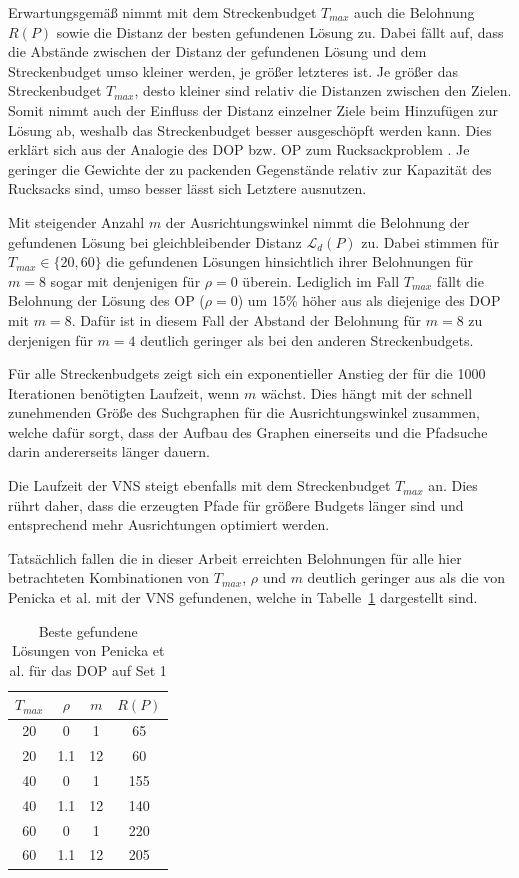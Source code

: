 \documentclass[12pt,a4paper,twoside]{article}
\theoremstyle{definition}
\numberwithin{equation}{section}
\begin{document}
Erwartungsgemäß nimmt mit dem Streckenbudget $T_{max}$ auch die Belohnung $R(P)$ sowie die Distanz der besten gefundenen Lösung zu. Dabei fällt auf, dass die Abstände zwischen der Distanz der gefundenen Lösung und dem Streckenbudget umso kleiner werden, je größer letzteres ist. Je größer das Streckenbudget $T_{max}$, desto kleiner sind relativ die Distanzen zwischen den Zielen. Somit nimmt auch der Einfluss der Distanz einzelner Ziele beim Hinzufügen zur Lösung ab, weshalb das Streckenbudget besser ausgeschöpft werden kann. Dies erklärt sich aus der Analogie des DOP bzw. OP zum Rucksackproblem \cite{Nickel.2014}. Je geringer die Gewichte der zu packenden Gegenstände relativ zur Kapazität des Rucksacks sind, umso besser lässt sich Letztere ausnutzen.

Mit steigender Anzahl $m$ der Ausrichtungswinkel nimmt die Belohnung der gefundenen Lösung bei gleichbleibender Distanz $\mathcal{L}_d(P)$ zu. Dabei stimmen für $T_{max} \in \{20,60\}$ die gefundenen Lösungen hinsichtlich ihrer Belohnungen für $m = 8$ sogar mit denjenigen für $\rho = 0$ überein. Lediglich im Fall $T_{max}$ fällt die Belohnung der Lösung des OP ($\rho = 0$) um 15\% höher aus als diejenige des DOP mit $m = 8$. Dafür ist in diesem Fall der Abstand der Belohnung für $m = 8$ zu derjenigen für $m = 4$ deutlich geringer als bei den anderen Streckenbudgets.

Für alle Streckenbudgets zeigt sich ein exponentieller Anstieg der für die 1000 Iterationen benötigten Laufzeit, wenn $m$ wächst. Dies hängt mit der schnell zunehmenden Größe des Suchgraphen für die Ausrichtungswinkel zusammen, welche dafür sorgt, dass der Aufbau des Graphen einerseits und die Pfadsuche darin andererseits länger dauern.

Die Laufzeit der VNS steigt ebenfalls mit dem Streckenbudget $T_{max}$ an. Dies rührt daher, dass die erzeugten Pfade für größere Budgets länger sind und entsprechend mehr Ausrichtungen optimiert werden.

Tatsächlich fallen die in dieser Arbeit erreichten Belohnungen für alle hier betrachteten Kombinationen von $T_{max}$, $\rho$ und $m$ deutlich geringer aus als die von Penicka et al. \cite{R.Penicka.2017} mit der VNS gefundenen, welche in Tabelle~\ref{tab:Results_Penicka} dargestellt sind.

\begin{table}[h]
	\centering
	\begin{tabular}{ |c|c|c|c| }
		\hline
		$T_{max}$ & $\rho$ & $m$ &  $R(P)$ \\
		\hline  
		20 & 0 & 1  & 65\\
		20 & 1.1 & 12  & 60\\ 
		40 & 0 & 1  & 155\\
		40 & 1.1 & 12 & 140\\
		60 & 0 & 1  & 220\\
		60 & 1.1 & 12  & 205\\
		\hline
	\end{tabular}
	\caption{Beste gefundene Lösungen von Penicka et al. \cite{R.Penicka.2017} für das DOP auf Set 1}
	\label{tab:Results_Penicka}
\end{table}
\end{document}
